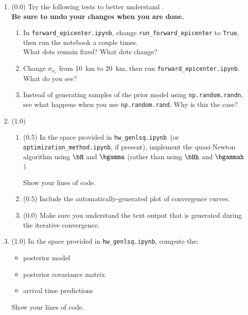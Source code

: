 \documentclass[11pt,titlepage,fleqn]{article}
\newcommand{\tfile}{{\tt hw\_genlsq.ipynb}}
\newcommand{\tfileFE}{{\tt forward\_epicenter.ipynb}}
\newcommand{\tfileOM}{{\tt optimization\_method.ipynb}}
\begin{document}
\begin{enumerate}

\item (0.0) Try the following tests to better understand . \\
{\bf Be sure to undo your changes when you are done.}
%
\begin{enumerate}
\item In \tfileFE, change \verb+run_forward_epicenter+ to \verb+True+, then run the notebook a couple times. \\
What dots remain fixed? What dots change?

\item Change $\sigma_{x_s}$ from 10~km to 20~km, then run \tfileFE. What do you see?

\item Instead of generating samples of the prior model using \verb+np.random.randn+, see what happens when you use \verb+np.random.rand+. Why is this the case?
\end{enumerate}

\item (1.0)
%
\begin{enumerate}
\item (0.5) In the space provided in \tfile\ (or \tfileOM, if present), implement the quasi-Newton algorithm using $\bH$ and $\bgamma$ (rather than using $\bHh$ and $\bgammah$).

Show your lines of code.

\item (0.5) Include the automatically-generated plot of convergence curves.

\item (0.0) Make sure you understand the text output that is generated during the iterative convergence.
\end{enumerate}


\item (1.0) In the space provided in \tfile, compute the:
%
\begin{itemize}
\item posterior model
\item posterior covariance matrix
\item arrival time predictions
\end{itemize}

Show your lines of code.


\end{enumerate}
\end{document}
